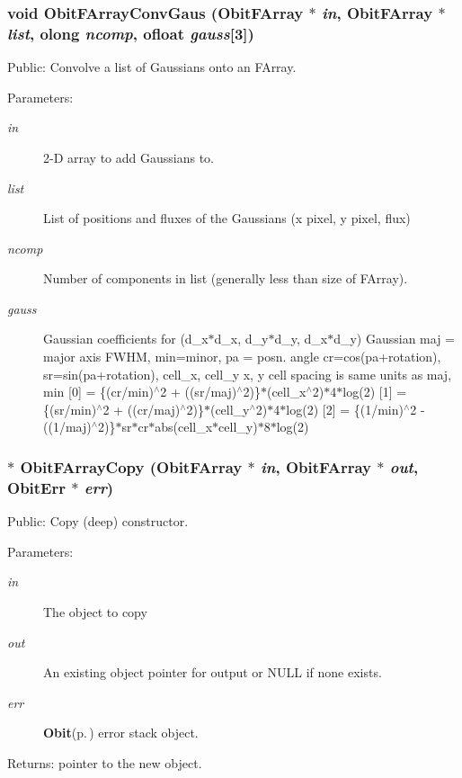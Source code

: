 \subsubsection{\setlength{\rightskip}{0pt plus 5cm}void Obit\-FArray\-Conv\-Gaus ({\bf Obit\-FArray} $\ast$ {\em in}, {\bf Obit\-FArray} $\ast$ {\em list}, {\bf olong} {\em ncomp}, {\bf ofloat} {\em gauss}[3])}\label{ObitFArray_8h_a107}


Public: Convolve a list of Gaussians onto an FArray. 

\begin{Desc}
\item[Parameters:]
\begin{description}
\item[{\em in}]2-D array to add Gaussians to. \item[{\em list}]List of positions and fluxes of the Gaussians (x pixel, y pixel, flux) \item[{\em ncomp}]Number of components in list (generally less than size of FArray). \item[{\em gauss}]Gaussian coefficients for (d\_\-x$\ast$d\_\-x, d\_\-y$\ast$d\_\-y, d\_\-x$\ast$d\_\-y) Gaussian maj = major axis FWHM, min=minor, pa = posn. angle cr=cos(pa+rotation), sr=sin(pa+rotation), cell\_\-x, cell\_\-y x, y cell spacing is same units as maj, min [0] = \{(cr/min)$^\wedge$2 + ((sr/maj)$^\wedge$2)\}$\ast$(cell\_\-x$^\wedge$2)$\ast$4$\ast$log(2) [1] = \{(sr/min)$^\wedge$2 + ((cr/maj)$^\wedge$2)\}$\ast$(cell\_\-y$^\wedge$2)$\ast$4$\ast$log(2) [2] = \{(1/min)$^\wedge$2 - ((1/maj)$^\wedge$2)\}$\ast$sr$\ast$cr$\ast$abs(cell\_\-x$\ast$cell\_\-y)$\ast$8$\ast$log(2) \end{description}
\end{Desc}
\subsubsection{$\ast$ Obit\-FArray\-Copy ({\bf Obit\-FArray} $\ast$ {\em in}, {\bf Obit\-FArray} $\ast$ {\em out}, {\bf Obit\-Err} $\ast$ {\em err})}\label{ObitFArray_8h_a58}


Public: Copy (deep) constructor. 

\begin{Desc}
\item[Parameters:]
\begin{description}
\item[{\em in}]The object to copy \item[{\em out}]An existing object pointer for output or NULL if none exists. \item[{\em err}]{\bf Obit}{\rm (p.\,\pageref{structObit})} error stack object. \end{description}
\end{Desc}
\begin{Desc}
\item[Returns:]pointer to the new object. \end{Desc}
